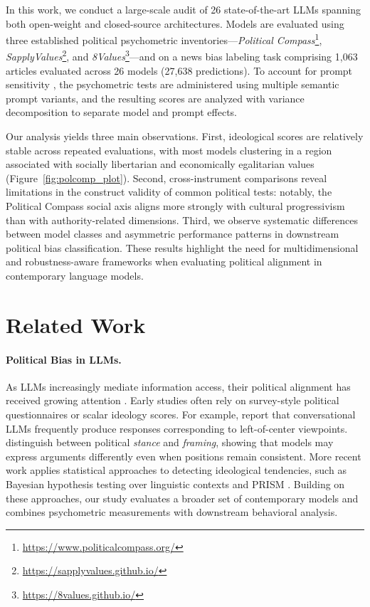 \documentclass[11pt]{article}
\begin{document}
In this work, we conduct a large-scale audit of 26 state-of-the-art LLMs spanning both open-weight and closed-source architectures. Models are evaluated using three established political psychometric inventories—\textit{Political Compass}\footnote{\url{https://www.politicalcompass.org/}}, \textit{SapplyValues}\footnote{\url{https://sapplyvalues.github.io/}}, and \textit{8Values}\footnote{\url{https://8values.github.io/}}—and on a news bias labeling task comprising 1,063 articles evaluated across 26 models (27,638 predictions). To account for prompt sensitivity \cite{rottger-etal-2024-political}, the psychometric tests are administered using multiple semantic prompt variants, and the resulting scores are analyzed with variance decomposition to separate model and prompt effects.

Our analysis yields three main observations. First, ideological scores are relatively stable across repeated evaluations, with most models clustering in a region associated with socially libertarian and economically egalitarian values (Figure~\ref{fig:polcomp_plot}). Second, cross-instrument comparisons reveal limitations in the construct validity of common political tests: notably, the Political Compass social axis aligns more strongly with cultural progressivism than with authority-related dimensions. Third, we observe systematic differences between model classes and asymmetric performance patterns in downstream political bias classification. These results highlight the need for multidimensional and robustness-aware frameworks when evaluating political alignment in contemporary language models.



\section{Related Work}

\paragraph{Political Bias in LLMs.}
As LLMs increasingly mediate information access, their political alignment has received growing attention \cite{Gallegos2024}. Early studies often rely on survey-style political questionnaires or scalar ideology scores. For example, \citet{10.1371/journal.pone.0306621} report that conversational LLMs frequently produce responses corresponding to left-of-center viewpoints. \citet{bang-etal-2024-measuring} distinguish between political \textit{stance} and \textit{framing}, showing that models may express arguments differently even when positions remain consistent. More recent work applies statistical approaches to detecting ideological tendencies, such as Bayesian hypothesis testing over linguistic contexts \cite{si_detecting_2025} and PRISM \cite{azzopardi-moshfeghi-2025-pow}. Building on these approaches, our study evaluates a broader set of contemporary models and combines psychometric measurements with downstream behavioral analysis.
\end{document}
